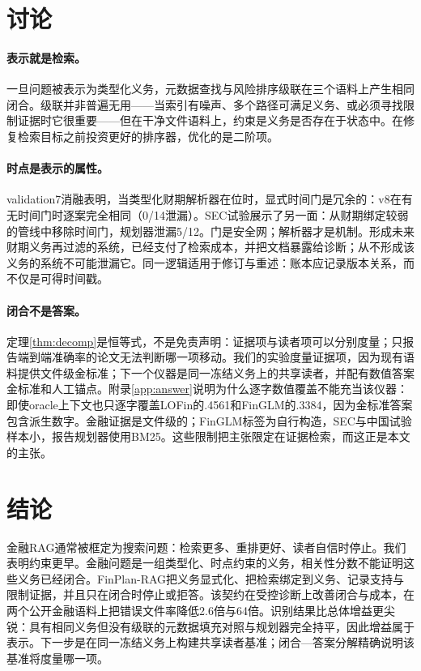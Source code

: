 \documentclass[10.5pt,a4paper]{ctexart}
\newcommand{\finplan}{FinPlan\mbox{-}RAG}
\begin{document}
\section{讨论}
\label{sec:discussion}
\paragraph{表示就是检索。}一旦问题被表示为类型化义务，元数据查找与风险排序级联在三个语料上产生相同闭合。级联并非普遍无用——当索引有噪声、多个路径可满足义务、或必须寻找限制证据时它很重要——但在干净文件语料上，约束是义务是否存在于状态中。在修复检索目标之前投资更好的排序器，优化的是二阶项。

\paragraph{时点是表示的属性。}validation7消融表明，当类型化财期解析器在位时，显式时间门是冗余的：v8在有无时间门时逐案完全相同（0/14泄漏）。SEC试验展示了另一面：从财期绑定较弱的管线中移除时间门，规划器泄漏5/12。门是安全网；解析器才是机制。形成未来财期义务再过滤的系统，已经支付了检索成本，并把文档暴露给诊断；从不形成该义务的系统不可能泄漏它。同一逻辑适用于修订与重述：账本应记录版本关系，而不仅是可得时间戳。

\paragraph{闭合不是答案。}定理\ref{thm:decomp}是恒等式，不是免责声明：证据项与读者项可以分别度量；只报告端到端准确率的论文无法判断哪一项移动。我们的实验度量证据项，因为现有语料提供文件级金标准；下一个仪器是同一冻结义务上的共享读者，并配有数值答案金标准和人工锚点。附录\ref{app:answer}说明为什么逐字数值覆盖不能充当该仪器：即使oracle上下文也只逐字覆盖LOFin的.4561和FinGLM的.3384，因为金标准答案包含派生数字。金融证据是文件级的；FinGLM标签为自行构造，SEC与中国试验样本小，报告规划器使用BM25。这些限制把主张限定在证据检索，而这正是本文的主张。

\section{结论}
金融RAG通常被框定为搜索问题：检索更多、重排更好、读者自信时停止。我们表明约束更早。金融问题是一组类型化、时点约束的义务，相关性分数不能证明这些义务已经闭合。\finplan{}把义务显式化、把检索绑定到义务、记录支持与限制证据，并且只在闭合时停止或拒答。该契约在受控诊断上改善闭合与成本，在两个公开金融语料上把错误文件率降低2.6倍与64倍。识别结果比总体增益更尖锐：具有相同义务但没有级联的元数据填充对照与规划器完全持平，因此增益属于表示。下一步是在同一冻结义务上构建共享读者基准；闭合—答案分解精确说明该基准将度量哪一项。
\end{document}
